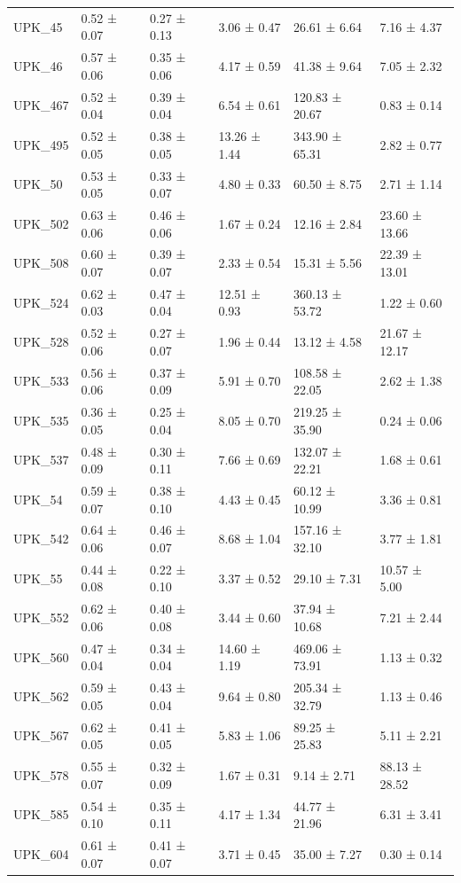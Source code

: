 \begin{tabular}{llllll}
UPK_45 & 0.52 ± 0.07 & 0.27 ± 0.13 & 3.06 ± 0.47 & 26.61 ± 6.64 & 7.16 ± 4.37 \\
UPK_46 & 0.57 ± 0.06 & 0.35 ± 0.06 & 4.17 ± 0.59 & 41.38 ± 9.64 & 7.05 ± 2.32 \\
UPK_467 & 0.52 ± 0.04 & 0.39 ± 0.04 & 6.54 ± 0.61 & 120.83 ± 20.67 & 0.83 ± 0.14 \\
UPK_495 & 0.52 ± 0.05 & 0.38 ± 0.05 & 13.26 ± 1.44 & 343.90 ± 65.31 & 2.82 ± 0.77 \\
UPK_50 & 0.53 ± 0.05 & 0.33 ± 0.07 & 4.80 ± 0.33 & 60.50 ± 8.75 & 2.71 ± 1.14 \\
UPK_502 & 0.63 ± 0.06 & 0.46 ± 0.06 & 1.67 ± 0.24 & 12.16 ± 2.84 & 23.60 ± 13.66 \\
UPK_508 & 0.60 ± 0.07 & 0.39 ± 0.07 & 2.33 ± 0.54 & 15.31 ± 5.56 & 22.39 ± 13.01 \\
UPK_524 & 0.62 ± 0.03 & 0.47 ± 0.04 & 12.51 ± 0.93 & 360.13 ± 53.72 & 1.22 ± 0.60 \\
UPK_528 & 0.52 ± 0.06 & 0.27 ± 0.07 & 1.96 ± 0.44 & 13.12 ± 4.58 & 21.67 ± 12.17 \\
UPK_533 & 0.56 ± 0.06 & 0.37 ± 0.09 & 5.91 ± 0.70 & 108.58 ± 22.05 & 2.62 ± 1.38 \\
UPK_535 & 0.36 ± 0.05 & 0.25 ± 0.04 & 8.05 ± 0.70 & 219.25 ± 35.90 & 0.24 ± 0.06 \\
UPK_537 & 0.48 ± 0.09 & 0.30 ± 0.11 & 7.66 ± 0.69 & 132.07 ± 22.21 & 1.68 ± 0.61 \\
UPK_54 & 0.59 ± 0.07 & 0.38 ± 0.10 & 4.43 ± 0.45 & 60.12 ± 10.99 & 3.36 ± 0.81 \\
UPK_542 & 0.64 ± 0.06 & 0.46 ± 0.07 & 8.68 ± 1.04 & 157.16 ± 32.10 & 3.77 ± 1.81 \\
UPK_55 & 0.44 ± 0.08 & 0.22 ± 0.10 & 3.37 ± 0.52 & 29.10 ± 7.31 & 10.57 ± 5.00 \\
UPK_552 & 0.62 ± 0.06 & 0.40 ± 0.08 & 3.44 ± 0.60 & 37.94 ± 10.68 & 7.21 ± 2.44 \\
UPK_560 & 0.47 ± 0.04 & 0.34 ± 0.04 & 14.60 ± 1.19 & 469.06 ± 73.91 & 1.13 ± 0.32 \\
UPK_562 & 0.59 ± 0.05 & 0.43 ± 0.04 & 9.64 ± 0.80 & 205.34 ± 32.79 & 1.13 ± 0.46 \\
UPK_567 & 0.62 ± 0.05 & 0.41 ± 0.05 & 5.83 ± 1.06 & 89.25 ± 25.83 & 5.11 ± 2.21 \\
UPK_578 & 0.55 ± 0.07 & 0.32 ± 0.09 & 1.67 ± 0.31 & 9.14 ± 2.71 & 88.13 ± 28.52 \\
UPK_585 & 0.54 ± 0.10 & 0.35 ± 0.11 & 4.17 ± 1.34 & 44.77 ± 21.96 & 6.31 ± 3.41 \\
UPK_604 & 0.61 ± 0.07 & 0.41 ± 0.07 & 3.71 ± 0.45 & 35.00 ± 7.27 & 0.30 ± 0.14 \\

\end{tabular}
